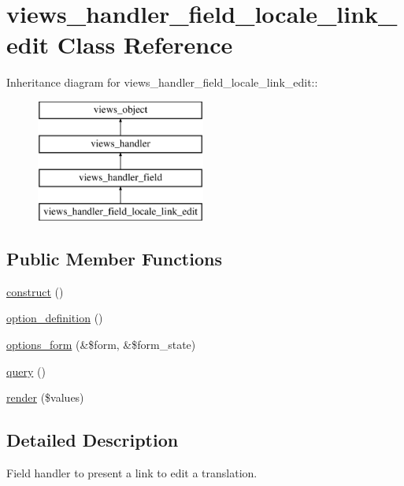 \hypertarget{classviews__handler__field__locale__link__edit}{
\section{views\_\-handler\_\-field\_\-locale\_\-link\_\-edit Class Reference}
\label{classviews__handler__field__locale__link__edit}
}
Inheritance diagram for views\_\-handler\_\-field\_\-locale\_\-link\_\-edit::\begin{figure}[H]
\begin{center}
\leavevmode
\includegraphics[height=4cm]{classviews__handler__field__locale__link__edit}
\end{center}
\end{figure}
\subsection*{Public Member Functions}
\begin{CompactItemize}
\item 
\hyperlink{classviews__handler__field__locale__link__edit_6f7db94c0dc07564c1853fd7ef153a6e}{construct} ()
\item 
\hyperlink{classviews__handler__field__locale__link__edit_b96dd9ff121303f96d4f9cdbbb3ca906}{option\_\-definition} ()
\item 
\hyperlink{classviews__handler__field__locale__link__edit_dcbd4b327f8cbcd2d75e0c145b00e42d}{options\_\-form} (\&\$form, \&\$form\_\-state)
\item 
\hyperlink{classviews__handler__field__locale__link__edit_da85b88e681ca38a7c7d66deb133ae65}{query} ()
\item 
\hyperlink{classviews__handler__field__locale__link__edit_ea9a4b5bf4281c17e787bae9fee408bd}{render} (\$values)
\end{CompactItemize}


\subsection{Detailed Description}
Field handler to present a link to edit a translation. 

